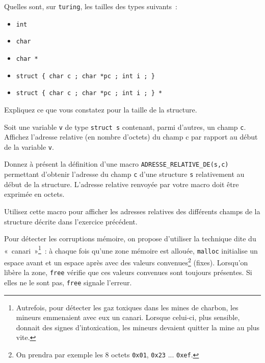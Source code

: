 %



\question

Quelles sont, sur \texttt {turing}, les tailles des types suivants~:
\begin {itemize}
    \item \texttt {int}
    \item \texttt {char}
    \item \texttt {char *}
    \item \verb|struct { char c ; char *pc ; int i ; }|
    \item \verb|struct { char c ; char *pc ; int i ; } *|
\end {itemize}

Expliquez ce que vous constatez pour la taille de la structure.


\question

Soit une variable \texttt {v} de type \texttt {struct s} contenant, parmi
d'autres, un champ \texttt {c}. Affichez l'adresse relative (en nombre
d'octets) du champ {c} par rapport au début de la variable \texttt {v}.

Donnez à présent la définition d'une macro
\verb|ADRESSE_RELATIVE_DE(s,c)| permettant d'obtenir l'adresse du champ
\texttt {c} d'une structure \texttt {s} relativement au début de la
structure. L'adresse relative renvoyée par votre macro doit être
exprimée en octets.

Utilisez cette macro pour afficher les adresses relatives des différents
champs de la structure décrite dans l'exercice précédent.


\question

Pour détecter les corruptions mémoire, on propose d'utiliser
la technique dite du «~canari~»\footnote{Autrefois, pour détecter
les gaz toxiques dans les mines de charbon, les mineurs emmenaient
avec eux un canari. Lorsque celui-ci, plus sensible, donnait des
signes d'intoxication, les mineurs devaient quitter la mine au plus
vite.}~: à chaque fois qu'une zone mémoire est allouée, \texttt
{malloc} initialise un espace avant et un espace après avec des valeurs
convenues\footnote {On prendra par exemple les 8 octets \texttt {0x01},
\texttt {0x23} ... \texttt {0xef}.} (fixes).  Lorsqu'on libère la
zone, \texttt {free} vérifie que ces valeurs convenues sont toujours
présentes. Si elles ne le sont pas, \texttt {free} signale l'erreur.

